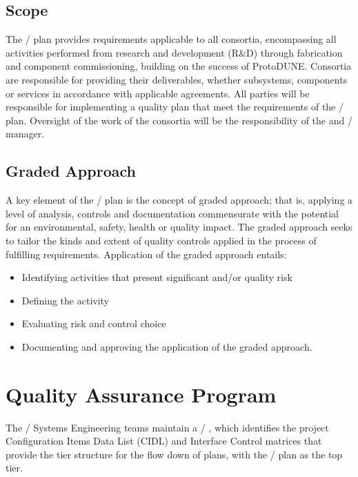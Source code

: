 \subsection{Scope}

The /  plan provides 
requirements applicable to all consortia, encompassing all activities
performed from research and development (R\&D) through fabrication and
component commissioning, building on the success of
ProtoDUNE. Consortia are responsible for providing their deliverables,
whether subsystems, components or services in accordance with
applicable agreements. All parties will be responsible for
implementing a quality plan that meet the requirements of the
/  plan. Oversight of the work of
the consortia will be the responsibility of the 
 and / 
manager.

\subsection{Graded Approach}

A key element of the /  plan is the
concept of graded approach; that is, applying a level of analysis,
controls and documentation commensurate with the potential for an
environmental, safety, health or quality impact. The graded approach
seeks to tailor the kinds and extent of quality controls applied in
the process of fulfilling requirements. Application of the graded
approach entails:
\begin{itemize}
  \item Identifying activities that present significant 
    and/or quality risk
  \item Defining the activity
  \item Evaluating risk and control choice
  \item Documenting and approving the application of the graded
    approach.
\end{itemize}

\section{Quality Assurance Program}

The / Systems Engineering teams maintain a
/ , which identifies the  project
Configuration Items Data List (CIDL) and Interface Control matrices
that provide the tier structure for the flow down of  plans,
with the /  plan as the top tier.

